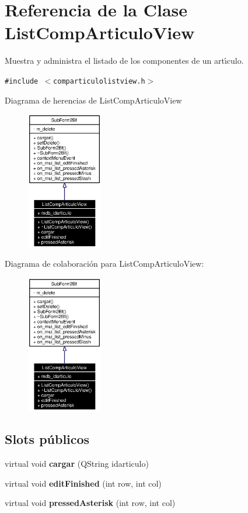 \section{Referencia de la Clase List\-Comp\-Articulo\-View}
\label{classListCompArticuloView}
Muestra y administra el listado de los componentes de un art\'{\i}culo.  


{\tt \#include $<$comparticulolistview.h$>$}

Diagrama de herencias de List\-Comp\-Articulo\-View\begin{figure}[H]
\begin{center}
\leavevmode
\includegraphics[width=94pt]{classListCompArticuloView__inherit__graph}
\end{center}
\end{figure}
Diagrama de colaboraci\'{o}n para List\-Comp\-Articulo\-View:\begin{figure}[H]
\begin{center}
\leavevmode
\includegraphics[width=94pt]{classListCompArticuloView__coll__graph}
\end{center}
\end{figure}
\subsection*{Slots p\'{u}blicos}
\begin{CompactItemize}
\item 
virtual void {\bf cargar} (QString idarticulo)\label{classListCompArticuloView_i0}

\item 
virtual void {\bf edit\-Finished} (int row, int col)\label{classListCompArticuloView_i1}

\item 
virtual void {\bf pressed\-Asterisk} (int row, int col)
\end{CompactItemize}
